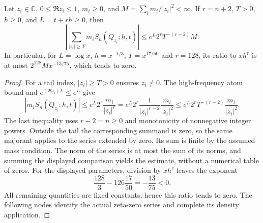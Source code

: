 \begin{lemma}
\label{kernel:high-tail}
\leanok
Let $z_i\in\mathbb C$, $0\leq\Re z_i\leq1$, $m_i\geq0$, and
$M=\sum_i m_i/|z_i|^2<\infty$.
If $r=n+2$, $T>0$, $h\geq0$, and $L=t+rh\geq0$, then
\[
 \left|\sum_{|z_i|\geq T}m_i S_n(Q_{z_i};h,t)\right|
 \leq e^L2^rT^{-(r-2)}M.
\]
In particular, for $L=\log x$, $h=x^{-1/3}$,
$T=x^{17/50}$ and $r=128$, its ratio to $xh^r$ is at most
$2^{128}M x^{-13/75}$, which tends to zero.
\end{lemma}
\begin{proof}
For a tail index, $|z_i|\geq T>0$ ensures $z_i\ne0$.
The high-frequency atom bound and
$e^{(\Re z_i)L}\leq e^L$ give
\[
 |m_iS_n(Q_{z_i};h,t)|
 \leq e^L2^r\frac{m_i}{|z_i|^r}
 =e^L2^r\frac1{|z_i|^{r-2}}\frac{m_i}{|z_i|^2}
 \leq e^L2^rT^{-(r-2)}\frac{m_i}{|z_i|^2}.
\]
The last inequality uses $r-2=n\geq0$ and monotonicity of nonnegative
integer powers.  Outside the tail the corresponding summand is zero,
so the same majorant applies to the series extended by zero.
Its sum is finite by the assumed mass condition.  The norm of the
series is at most the sum of its norms, and summing the displayed
comparison yields the estimate, without a numerical table of zeros.
For the displayed parameters, division by $xh^r$ leaves the exponent
\[
 \frac{128}{3}-126\frac{17}{50}=-\frac{13}{75}<0.
\]
All remaining quantities are fixed constants; hence this ratio tends
to zero.  The following nodes identify the actual zeta-zero series
and complete its density application.
\end{proof}

